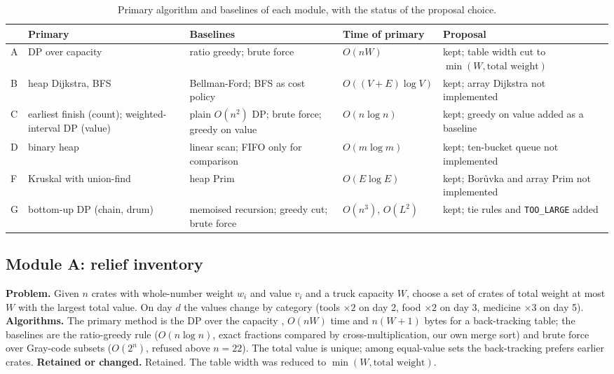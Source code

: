 \documentclass[11pt,a4paper]{article}
\newcommand{\cs}[1]{\texttt{#1}}
\begin{document}
\begin{table}[t]
\centering\small
\caption{Primary algorithm and baselines of each module, with the status of the proposal choice.}\label{tab:algos}
\begin{tabularx}{\textwidth}{@{}l>{\raggedright\arraybackslash}p{2.6cm}>{\raggedright\arraybackslash}p{3.7cm}>{\raggedright\arraybackslash}p{2.5cm}X@{}}
\toprule
 & Primary & Baselines & Time of primary & Proposal\\
\midrule
A & DP over capacity & ratio greedy; brute force & $O(nW)$ & kept; table width cut to $\min(W,\text{total weight})$\\
B & heap Dijkstra, BFS & Bellman-Ford; BFS as cost policy & $O((V+E)\log V)$ & kept; array Dijkstra not implemented\\
C & earliest finish (count); weighted-interval DP (value) & plain $O(n^2)$ DP; brute force; greedy on value & $O(n\log n)$ & kept; greedy on value added as a baseline\\
D & binary heap & linear scan; FIFO only for comparison & $O(m\log m)$ & kept; ten-bucket queue not implemented\\
F & Kruskal with union-find & heap Prim & $O(E\log E)$ & kept; Bor\r{u}vka and array Prim not implemented\\
G & bottom-up DP (chain, drum) & memoised recursion; greedy cut; brute force & $O(n^3)$, $O(L^2)$ & kept; tie rules and \cs{TOO\_LARGE} added\\
\bottomrule
\end{tabularx}
\end{table}

\subsection{Module A: relief inventory}
\textbf{Problem.} Given $n$ crates with whole-number weight $w_i$ and value $v_i$ and a truck capacity $W$, choose a set of crates of total weight at most $W$ with the largest total value.
On day $d$ the values change by category (tools $\times2$ on day 2, food $\times2$ on day 3, medicine $\times3$ on day 5).
\textbf{Algorithms.} The primary method is the DP over the capacity \cite{clrs}, $O(nW)$ time and $n(W+1)$ bytes for a back-tracking table; the baselines are the ratio-greedy rule \cite{mt} ($O(n\log n)$, exact fractions compared by cross-multiplication, our own merge sort) and brute force
over Gray-code subsets ($O(2^n)$, refused above $n=22$). The total value is unique; among equal-value sets the back-tracking prefers earlier crates.
\textbf{Retained or changed.} Retained. The table width was reduced to $\min(W,\text{total weight})$.
\end{document}
